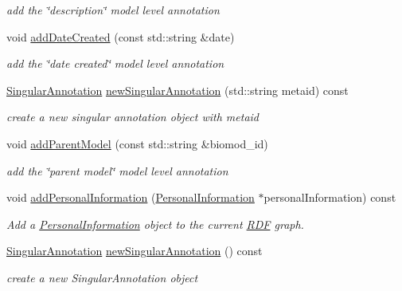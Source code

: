 \begin{DoxyCompactItemize}
\begin{DoxyCompactList}\small\item\em add the \char`\"{}description\char`\"{} model level annotation \end{DoxyCompactList}\item 
void \hyperlink{classomexmeta_1_1Editor_ae1b146f142ec10237f8edbecf0368f8e}{add\+Date\+Created} (const std\+::string \&date)
\begin{DoxyCompactList}\small\item\em add the \char`\"{}date created\char`\"{} model level annotation \end{DoxyCompactList}\item 
\hyperlink{classomexmeta_1_1Triple}{Singular\+Annotation} \hyperlink{classomexmeta_1_1Editor_a50674b2591d2fed572954ac8490ee21c}{new\+Singular\+Annotation} (std\+::string metaid) const
\begin{DoxyCompactList}\small\item\em create a new singular annotation object with metaid \end{DoxyCompactList}\item 
void \hyperlink{classomexmeta_1_1Editor_ad7240613a1f3e215af6e4a05d121508c}{add\+Parent\+Model} (const std\+::string \&biomod\+\_\+id)
\begin{DoxyCompactList}\small\item\em add the \char`\"{}parent model\char`\"{} model level annotation \end{DoxyCompactList}\item 
void \hyperlink{classomexmeta_1_1Editor_ae97ebb9bb2bc3ebd7d3b0a5eca9dfb0f}{add\+Personal\+Information} (\hyperlink{classomexmeta_1_1PersonalInformation}{Personal\+Information} $\ast$personal\+Information) const
\begin{DoxyCompactList}\small\item\em Add a \hyperlink{classomexmeta_1_1PersonalInformation}{Personal\+Information} object to the current \hyperlink{classomexmeta_1_1RDF}{R\+DF} graph. \end{DoxyCompactList}\item 
\hyperlink{classomexmeta_1_1Triple}{Singular\+Annotation} \hyperlink{classomexmeta_1_1Editor_a6142da2b89068e9638410c3c903e3b64}{new\+Singular\+Annotation} () const
\begin{DoxyCompactList}\small\item\em create a new Singular\+Annotation object \end{DoxyCompactList}\end{DoxyCompactItemize}


